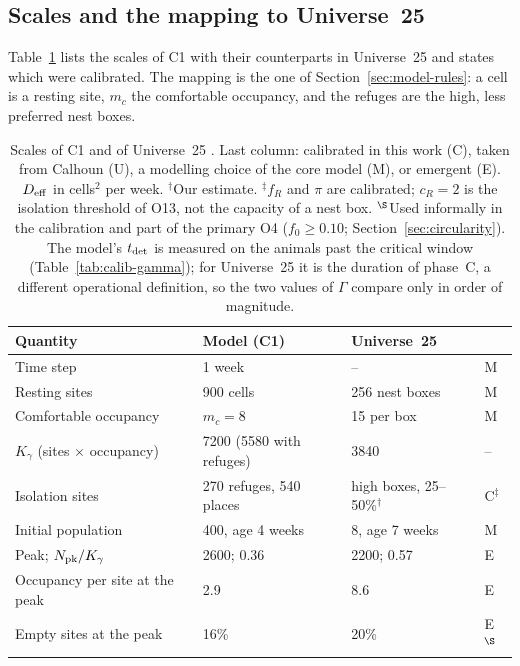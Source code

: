 \subsection{Scales and the mapping to Universe~25}
\label{app:calib-scales}

Table~\ref{tab:calib-scales} lists the scales of \textsf{C1} with their counterparts in Universe~25 and states which
were calibrated. The mapping is the one of Section~\ref{sec:model-rules}: a cell is a resting site, $m_c$ the
comfortable occupancy, and the refuges are the high, less preferred nest boxes.

\begin{table}[t]
  \centering
  \caption{Scales of \textsf{C1} and of Universe~25 \cite{Calhoun1973}. Last column: calibrated in this work (C),
  taken from Calhoun (U), a modelling choice of the core model (M), or emergent (E). $D_{\rm eff}$ in cells$^2$ per week. $^\dagger$Our estimate. $^\ddagger$$f_R$ and $\pi$
  are calibrated; $c_R=2$ is the isolation threshold of O13, not the capacity of a nest box. $^\S$Used informally in
  the calibration and part of the primary O4 ($f_0\ge0.10$; Section~\ref{sec:circularity}). The model's
  $t_{\rm det}$ is measured on the animals past the critical window (Table~\ref{tab:calib-gamma}); for Universe~25 it is
  the duration of phase~C, a different operational definition, so the two values of $\Gamma$ compare only in order of
  magnitude.}
  \label{tab:calib-scales}
  \small
  \begin{tabular}{@{}llll@{}}
    \toprule
    Quantity & Model (\textsf{C1}) & Universe~25 & \\
    \midrule
    Time step & 1 week & -- & M \\
    Resting sites & 900 cells & 256 nest boxes & M \\
    Comfortable occupancy & $m_c=8$ & 15 per box & M \\
    $K_\gamma$ (sites $\times$ occupancy) & 7200 (5580 with refuges) & 3840 & -- \\
    Isolation sites & 270 refuges, 540 places & high boxes, 25--50\%$^\dagger$ & C$^\ddagger$ \\
    Initial population & 400, age 4 weeks & 8, age 7 weeks & M \\
    Peak; $N_{\rm pk}/K_\gamma$ & 2600; 0.36 & 2200; 0.57 & E \\
    Occupancy per site at the peak & 2.9 & 8.6 & E \\
    Empty sites at the peak & 16\% & 20\% & E$^\S$ \\

\end{tabular}
\end{table}

